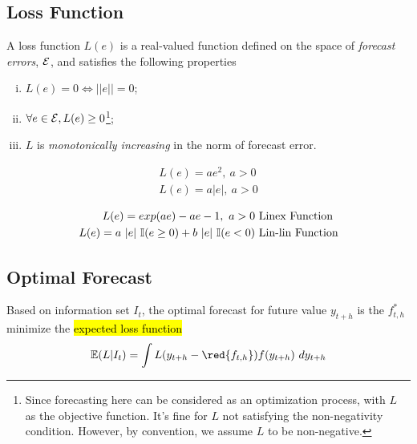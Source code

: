 \documentclass[11pt]{article}
\begin{document}
	\subsection{Loss Function}
		\begin{definition}
			A loss function $L(e)$ is a real-valued function defined on the space of \emph{forecast errors}, $\mathcal{{E}}$, and satisfies the following properties
			\begin{enumerate}[(i)]
				\item $L(e) = 0 \iff ||e|| = 0$;
				\item $\forall e \in \mathcal{{E}}, L(e) \geq 0$\footnote{Since forecasting here can be considered as an optimization process, with $L$ as the objective function. It's fine for $L$ not satisfying the non-negativity condition. However, by convention, we assume $L$ to be non-negative.};
				\item $L$ is \emph{monotonically increasing} in the norm of forecast error.
			\end{enumerate}
		\end{definition}
		
		\begin{example}[Symmetric Loss Functions with $\mc{E} = \R$]
			\begin{align}
				L(e) = a e^2,\ a > 0 \\
				L(e) = a |e|,\ a > 0
			\end{align}
		\end{example}
		
		\begin{example}[Asymmetric Loss Functions with $\mc{E} = \R$]
			\begin{align}
				L(e) = exp(ae) - ae - 1,\ a > 0 & \tx{ Linex Function} \\
				L(e) = a\ |e|\ \mathbb{I}(e \geq 0) + b\ |e|\ \mathbb{I}(e < 0) &\tx{ Lin-lin Function}
			\end{align}
		\end{example}
		
	\subsection{Optimal Forecast}
		\begin{definition}
			Based on information set $I_t$, the optimal forecast for future value $y_{t+h}$ is the $f^*_{t,h}$ minimize the \hl{expected loss function}
			\begin{equation}
				\expect{L|I_t} = \int L(y_{t+h} - \red{f_{t,h}}) f(y_{t+h})\ dy_{t+h}
			\end{equation}
		\end{definition}
		
\end{document}
